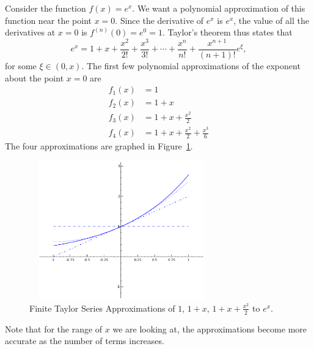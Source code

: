 \begin{example}
{\rm
  Consider the function $f(x) = e^x$.  We want a polynomial approximation of
  this function near the point $x = 0$.  Since the derivative of $e^x$ is
  $e^x$, the value of all the derivatives at $x = 0$ is $f^{(n)}(0) = e^0 = 1$.
  Taylor's theorem thus states that
  \[
  e^x = 1 + x + \frac{x^2}{2!} + \frac{x^3}{3!} + \cdots + \frac{x^n}{n!}
  + \frac{x^{n+1}}{(n+1)!} e^\xi,
  \]
  for some $\xi \in (0,x)$.  The first few polynomial approximations of 
  the exponent about the point $x = 0$ are 
  \begin{align*}
    f_1(x) &= 1 \\
    f_2(x) &= 1 + x \\
    f_3(x) &= 1 + x + \frac{x^2}{2} \\
    f_4(x) &= 1 + x + \frac{x^2}{2} + \frac{x^3}{6} 
  \end{align*}
  The four approximations are graphed in Figure~\ref{tayexp4}.

\begin{figure}[h!]
\begin{minipage}{\textwidth}
\begin{center}
\includegraphics[height=6cm,width=8cm]{tayexp3.eps}
\end{center}
\end{minipage}
\caption{Finite Taylor Series Approximations of $1$, $1+x$, $1+x+\frac{x^2}{2}$ to $e^x$.}
\label{fig:tayexp4}
\label{tayexp4}
\end{figure}


  Note that for the range of $x$ we are looking at, the approximations
  become more accurate as the number of terms increases.

}
\end{example}
